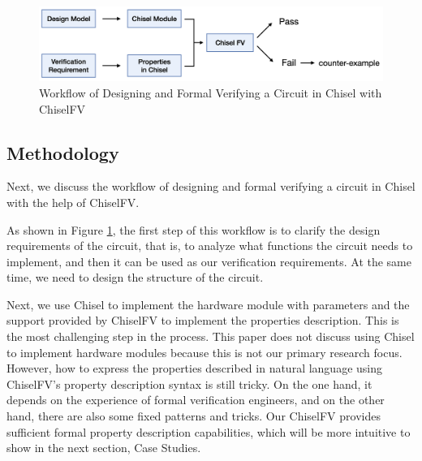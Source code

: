 \documentclass[conference]{IEEEtran}
\theoremstyle{definition}
\begin{document}
\begin{figure}[!htbp]
    \begin{center}
    \includegraphics[width=0.8\linewidth]{pics/workflow.png}
    \caption{Workflow of Designing and Formal Verifying a Circuit in Chisel with ChiselFV}
    \label{fig: workflow}
    \end{center}
\end{figure}

\subsection{Methodology}

Next, we discuss the workflow of designing and formal verifying a circuit in Chisel with the help of ChiselFV.

As shown in Figure \ref{fig: workflow}, the first step of this workflow is to clarify the design requirements of the circuit, that is, to analyze what functions the circuit needs to implement, and then it can be used as our verification requirements. At the same time, we need to design the structure of the circuit.

Next, we use Chisel to implement the hardware module with parameters and the support provided by ChiselFV to implement the properties description. This is the most challenging step in the process. This paper does not discuss using Chisel to implement hardware modules because this is not our primary research focus. However, how to express the properties described in natural language using ChiselFV's property description syntax is still tricky. On the one hand, it depends on the experience of formal verification engineers, and on the other hand, there are also some fixed patterns and tricks. Our ChiselFV provides sufficient formal property description capabilities, which will be more intuitive to show in the next section, Case Studies.
\end{document}
